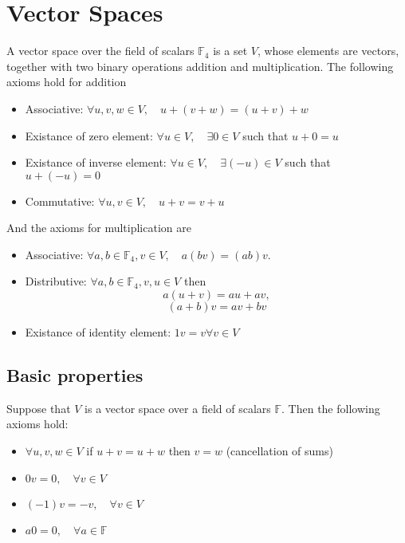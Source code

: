 \documentclass[12pt]{article}
\begin{document}
\section{Vector Spaces}
	\begin{defn}
		A vector space over the field of scalars $\mathbb{F}_4$ is a set $V$, whose elements are vectors, together with two binary operations addition and multiplication. The following axioms hold for addition
		\begin{itemize}
			\item Associative: $\forall u,v,w \in V, \quad u + ( v + w ) = (u + v) + w$
			\item Existance of zero element: $\forall u \in V, \quad \exists 0 \in V$ such that $u + 0 = u$
			\item Existance of inverse element: $\forall u \in V, \quad \exists (-u) \in V$ such that $u + (-u) = 0$
			\item Commutative: $\forall u,v \in V, \quad u + v = v + u$
		\end{itemize}
		And the axioms for multiplication are
		\begin{itemize}
			\item Associative: $\forall a,b \in \mathbb{F}_4, v \in V, \quad a(bv) = (ab)v$.
			\item Distributive: $\forall a,b \in \mathbb{F}_4, v,u \in V$ then
					\[
						a(u+v) = au + av,
					\]
					\[
						(a+b)v = av + bv
					\]
			\item Existance of identity element: $1v = v \forall v \in V$
		\end{itemize}
	\end{defn}
	
	\subsection{Basic properties}
	\begin{thm}
		Suppose that $V$ is a vector space over a field of scalars $\mathbb{F}$. Then the following axioms hold:
		\begin{itemize}
			\item $\forall u,v,w \in V$ if $u + v = u + w$ then $v=w$ (cancellation of sums)
			\item $0v = 0, \quad \forall v \in V$
			\item $(-1)v = -v, \quad \forall v \in V$
			\item $a0 = 0, \quad \forall a \in \mathbb{F}$
		\end{itemize}
	\end{thm}
	
\end{document}
